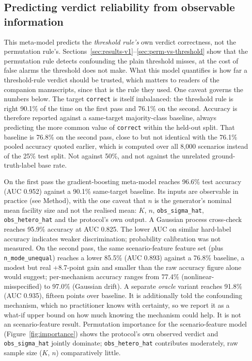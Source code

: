 \documentclass[journal=dce]{CUP-JNL-DTM}%
\begin{document}
\begin{appendix}
\subsection{Predicting verdict reliability from observable information}

This meta-model predicts the \emph{threshold rule's} own verdict correctness, not the permutation rule's. Sections~\ref{sec:results-v1}--\ref{sec:perm-vs-threshold} show that the permutation rule detects confounding the plain threshold misses, at the cost of false alarms the threshold does not make. What this model quantifies is how far a threshold-rule verdict should be trusted, which matters to readers of the companion manuscripts, since that is the rule they used. One caveat governs the numbers below. The target \texttt{correct} is itself imbalanced: the threshold rule is right 90.1\% of the time on the first pass and 76.1\% on the second. Accuracy is therefore reported against a same-target majority-class baseline, always predicting the more common value of \texttt{correct} within the held-out split. That baseline is 76.8\% on the second pass, close to but not identical with the 76.1\% pooled accuracy quoted earlier, which is computed over all 8,000 scenarios instead of the 25\% test split. Not against 50\%, and not against the unrelated ground-truth-label base rate.

On the first pass the gradient-boosting meta-model reaches 96.6\% test accuracy (AUC 0.952) against a 90.1\% same-target baseline. Its inputs are observable in practice (see Method), with the one caveat that $n$ is the generator's nominal mean facility size and not the realised mean: $K$, $n$, \texttt{obs\_sigma\_hat}, \texttt{obs\_hetero\_hat} and the protocol's own output. A Gaussian process cross-check reaches 95.9\% accuracy at AUC 0.825. The lower AUC on similar hard-label accuracy indicates weaker discrimination; probability calibration was not measured. On the second pass, the same scenario-feature feature set (plus \texttt{n\_mode\_unequal}) reaches a lower 85.5\% (AUC 0.893) against a 76.8\% baseline, a modest but real +8.7-point gain and smaller than the raw accuracy figure alone would suggest; per-mechanism accuracy ranges from 77.4\% (nonlinear-misspecified) to 97.0\% (Gaussian drift). A separate \emph{oracle} variant reaches 91.8\% (AUC 0.935), fifteen points over baseline. It is additionally told the confounding mechanism, which no practitioner knows with certainty, so we report it as a what-if upper bound on how much knowing the mechanism could help. It is not an scenario-feature result. Permutation importance for the scenario-feature model (Figure~\ref{fig:importance}) shows the protocol's own observed verdict and \texttt{obs\_sigma\_hat} jointly dominate; \texttt{obs\_hetero\_hat} contributes moderately, raw sample size ($K$, $n$) comparatively little.


\end{appendix}
\end{document}
